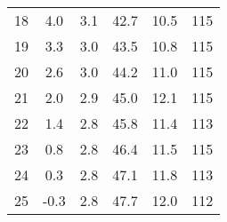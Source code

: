 \begin{table}[H]
\begin{tabular}[]{S[table-format=2.0] S S[table-format=1.1] S S S[table-format=3.0]}
       18 &  4.0  &  3.1 & 42.7  &  10.5  &  115 \\
       19 &  3.3  &  3.0 & 43.5  &  10.8  &  115 \\
       20 &  2.6  &  3.0 & 44.2  &  11.0  &  115 \\
       21 &  2.0  &  2.9 & 45.0  &  12.1  &  115 \\
       22 &  1.4  &  2.8 & 45.8  &  11.4  &  113 \\
       23 &  0.8  &  2.8 & 46.4  &  11.5  &  115 \\
       24 &  0.3  &  2.8 & 47.1  &  11.8  &  113 \\
       25 & -0.3  &  2.8 & 47.7  &  12.0  &  112 \\
    \bottomrule
    \end{tabular}
\end{table}